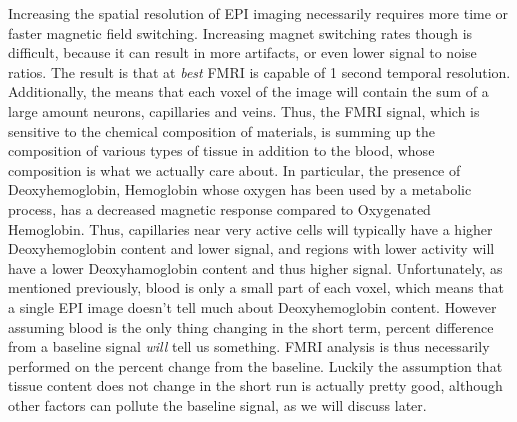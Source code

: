 \documentclass{article}
\begin{document}
Increasing the spatial resolution of EPI imaging necessarily 
requires more time or faster magnetic field switching. Increasing
magnet switching rates though is difficult, because it can result in
more artifacts, or even lower signal to noise ratios. The result is
that at \emph{best} FMRI is capable of 1 second temporal resolution. 
Additionally, the means that each voxel of the image will contain 
the sum of a large amount neurons, capillaries and veins. Thus, the
FMRI signal, which is sensitive to the chemical composition of 
materials, is summing up the composition of various types of tissue
in addition to the blood, whose composition is what we actually care about.
In particular, the presence of Deoxyhemoglobin, Hemoglobin whose
oxygen has been used by a metabolic process, has a decreased magnetic
response compared to Oxygenated Hemoglobin. Thus, capillaries near
very active cells will typically have a higher Deoxyhemoglobin content and
lower signal, and regions with lower activity will have a lower 
Deoxyhamoglobin content and thus higher signal.
Unfortunately, as mentioned previously, blood is only a small part of
each voxel, which means that a single EPI image doesn't tell much about
Deoxyhemoglobin content. However assuming blood is the only thing changing
in the short term, percent difference from a baseline signal \emph{will}
tell us something. FMRI analysis is thus necessarily performed on the percent change
from the baseline. Luckily the assumption that tissue content does not change in
the short run is actually pretty good, although other factors can pollute
the baseline signal, as we will discuss later. 
\end{document}
